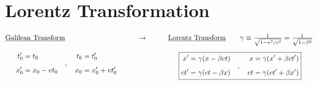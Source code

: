 \documentclass[12pt]{article}
\begin{document}
\section{Lorentz Transformation}

\vspace*{10pt}
\(\begin{aligned}[t]
	&\text{\underline{Galilean Transform}}\\[10pt]
	&\indent\begin{aligned}
		t_0' &= t_0\\[5pt]
		x_0' &= x_0 - vt_0
	\end{aligned} \ \ \ , \ \ \
	\begin{aligned}
		t_0 &= t'_0\\[5pt]
		x_0 &= x'_0 + vt'_0
	\end{aligned}
\end{aligned}
\hspace{1cm}
\rightarrow
\hspace{1cm}
\begin{aligned}[t]
	&\text{\underline{Lorentz Transform}} \hspace{20pt} 
		\gamma \equiv \tfrac{1}{\sqrt{1 - v^2/c^2}} = \tfrac{1}{\sqrt{1 - \beta^2}}\\[5pt]
	&\indent\boxed{\begin{aligned}
		x' &= \gamma (x - \beta ct)\\[5pt]
		ct' &= \gamma (ct - \beta x)
	\end{aligned}\ \ \ , \ \ \
	\begin{aligned}
		x &= \gamma (x' + \beta ct')\\[5pt]
		ct &= \gamma (ct' + \beta x')
	\end{aligned}}
\end{aligned}\)
\end{document}
